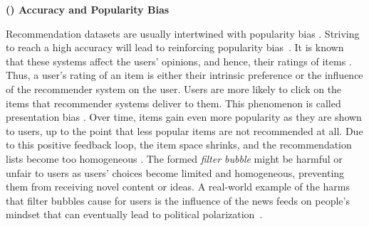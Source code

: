 

\vspace{0.25cm}
\noindent \textbf{() Accuracy and Popularity Bias}
\vspace{0.25cm}

Recommendation datasets are usually intertwined with popularity bias \cite{celma2008hits,lee2014fairness}. Striving to reach a high accuracy will lead to reinforcing popularity bias~\cite{barocas2016big}. It is known that these systems affect the users’ opinions, and hence, their ratings of items \cite{Cosley2003Influence}. Thus, a user’s rating of an item is either their intrinsic preference or the influence of the recommender system on the user. Users are more likely to click on the items that recommender systems deliver to them. This phenomenon is called presentation bias \cite{baeza2018bias}. 
Over time, items gain even more popularity as they are shown to users, up to the point that less popular items are not recommended at all. Due to this positive feedback loop, the item space shrinks, and the recommendation lists become too homogeneous \cite{Chaney2018Homogeneity}. The formed \textit{filter bubble} might be harmful or unfair to users as users' choices become limited and homogeneous, preventing them from receiving novel content or ideas. A real-world example of the harms that filter bubbles cause for users is the influence of the news feeds on people's mindset that can eventually lead to political polarization~\cite{HONG2016777}.



